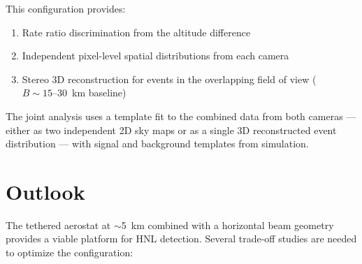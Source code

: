 \documentclass[11pt]{article}
\begin{document}
This configuration provides:
\begin{enumerate}[nosep]
  \item Rate ratio discrimination from the altitude difference
  \item Independent pixel-level spatial distributions from each camera
  \item Stereo 3D reconstruction for events in the overlapping
        field of view ($B \sim 15\text{--}30$~km baseline)
\end{enumerate}

The joint analysis uses a template fit to the combined data from both
cameras --- either as two independent 2D sky maps or as a single
3D reconstructed event distribution --- with signal and background
templates from simulation.


\section{Outlook}
\label{sec:outlook}

The tethered aerostat at $\sim$5~km combined with a horizontal beam
geometry provides a viable platform for HNL detection.  Several
trade-off studies are needed to optimize the configuration:
\end{document}
